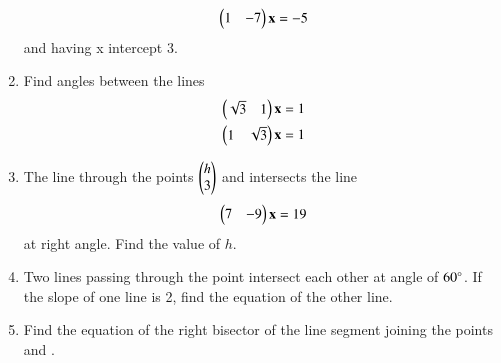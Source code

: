 \begin{enumerate}[label=\arabic*.,ref=\thesubsection.\theenumi]
\begin{align}
\begin{pmatrix}1 & -7\end{pmatrix}\mathbf{x} = -5
\end{align}
and having x intercept 3.
\\
\solution

\item Find angles between the lines
\begin{align}
\begin{pmatrix}\sqrt{3} & 1\end{pmatrix}\mathbf{x} &= 1
\\
\begin{pmatrix}1 & \sqrt{3}\end{pmatrix}\mathbf{x} &= 1
\end{align}
\item The line through the points $\begin{pmatrix}h\\3\end{pmatrix}$ and  intersects the line 
\begin{align}
\begin{pmatrix}7 & -9\end{pmatrix}\mathbf{x} = 19
\end{align}
at right angle.  Find the value of $h$.
\\
\solution
%
\item Two lines passing through the point  intersect each other at angle of $60\degree$.  If the slope of one line is 2, find the equation of the other line.
\\
\solution

\item Find the equation of the right bisector of the line segment joining the points  and .
\\
\solution



\end{enumerate}
